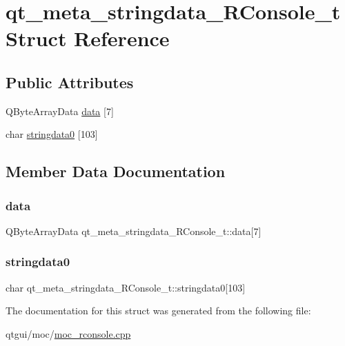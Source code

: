 \hypertarget{structqt__meta__stringdata___r_console__t}{}\section{qt\+\_\+meta\+\_\+stringdata\+\_\+\+R\+Console\+\_\+t Struct Reference}
\label{structqt__meta__stringdata___r_console__t}
\subsection*{Public Attributes}
\begin{DoxyCompactItemize}
\item 
Q\+Byte\+Array\+Data \mbox{\hyperlink{structqt__meta__stringdata___r_console__t_a7691806dd4a1e1fb24f8c9a27c57747f}{data}} \mbox{[}7\mbox{]}
\item 
char \mbox{\hyperlink{structqt__meta__stringdata___r_console__t_ae0aa6ce87bf4ef514fad0e1ae84d311e}{stringdata0}} \mbox{[}103\mbox{]}
\end{DoxyCompactItemize}


\subsection{Member Data Documentation}
\mbox{\label{structqt__meta__stringdata___r_console__t_a7691806dd4a1e1fb24f8c9a27c57747f}} 
\subsubsection{\texorpdfstring{data}{data}}
{\footnotesize\ttfamily Q\+Byte\+Array\+Data qt\+\_\+meta\+\_\+stringdata\+\_\+\+R\+Console\+\_\+t\+::data\mbox{[}7\mbox{]}}

\mbox{\label{structqt__meta__stringdata___r_console__t_ae0aa6ce87bf4ef514fad0e1ae84d311e}} 
\subsubsection{\texorpdfstring{stringdata0}{stringdata0}}
{\footnotesize\ttfamily char qt\+\_\+meta\+\_\+stringdata\+\_\+\+R\+Console\+\_\+t\+::stringdata0\mbox{[}103\mbox{]}}



The documentation for this struct was generated from the following file\+:\begin{DoxyCompactItemize}
\item 
qtgui/moc/\mbox{\hyperlink{moc__rconsole_8cpp}{moc\+\_\+rconsole.\+cpp}}\end{DoxyCompactItemize}
